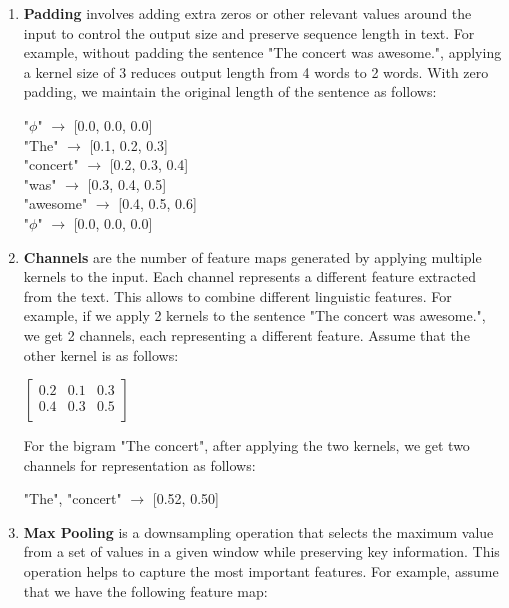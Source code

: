 \documentclass[10pt]{article}
\begin{document}
\begin{description}
\begin{enumerate}
        \item \textbf{Padding} involves adding extra zeros or other relevant values around the input to control the output size and preserve sequence length in text.
        For example, without padding the sentence "The concert was awesome.", applying a kernel size of 3 reduces output length from 4 words to 2 words.
        With zero padding, we maintain the original length of the sentence as follows:

        \begin{center}
            "$\phi$" $\rightarrow$ [0.0, 0.0, 0.0] \\
            "The" $\rightarrow$ [0.1, 0.2, 0.3] \\
            "concert" $\rightarrow$ [0.2, 0.3, 0.4] \\
            "was" $\rightarrow$ [0.3, 0.4, 0.5] \\
            "awesome" $\rightarrow$ [0.4, 0.5, 0.6] \\
            "$\phi$" $\rightarrow$ [0.0, 0.0, 0.0] \\
        \end{center}

        \item \textbf{Channels} are the number of feature maps generated by applying multiple kernels to the input. 
        Each channel represents a different feature extracted from the text. This allows to combine different linguistic features.
        For example, if we apply 2 kernels to the sentence "The concert was awesome.", we get 2 channels, each representing a different feature.
        Assume that the other kernel is as follows:

        \begin{center}
            $\displaystyle{\begin{bmatrix} 0.2 & 0.1 & 0.3 \\  0.4 & 0.3 & 0.5 \\ \end{bmatrix}}$
        \end{center}

        For the bigram "The concert", after applying the two kernels, we get two channels for representation as follows:

        \begin{center}
            "The", "concert" $\rightarrow$ [0.52, 0.50] \\
        \end{center}

        \item \textbf{Max Pooling} is a downsampling operation that selects the maximum value from a set of values in a given window while preserving key information.
        This operation helps to capture the most important features. For example, assume that we have the following feature map:


\end{enumerate}
\end{description}
\end{document}
